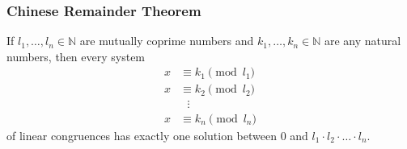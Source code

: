 \documentclass[aspectratio=169,11pt,usenames,dvipsnames]{beamer}
\newcommand{\N}{\mathbb{N}}
\begin{document}
\begin{frame}
 \frametitle{Chinese Remainder Theorem}
 \begin{tcolorbox}[title=Chinese Remainder Theorem]
  If $l_1,\ldots,l_n \in \N$ are \alert{mutually coprime} numbers and
  $k_1,\ldots,k_n \in \N$ are any natural numbers, then every
  system
  \begin{equation*}
   \begin{split}
    x & \equiv k_1 \pmod{l_1}\\
    x & \equiv k_2 \pmod{l_2}\\
      &~~~\vdots\\
    x & \equiv k_n \pmod{l_n}
   \end{split}
  \end{equation*}
  of linear congruences has \alert{exactly one solution} between $0$ and $l_1
  \cdot l_2 \cdot \ldots \cdot l_n$.
 \end{tcolorbox}
\end{frame}
\end{document}
